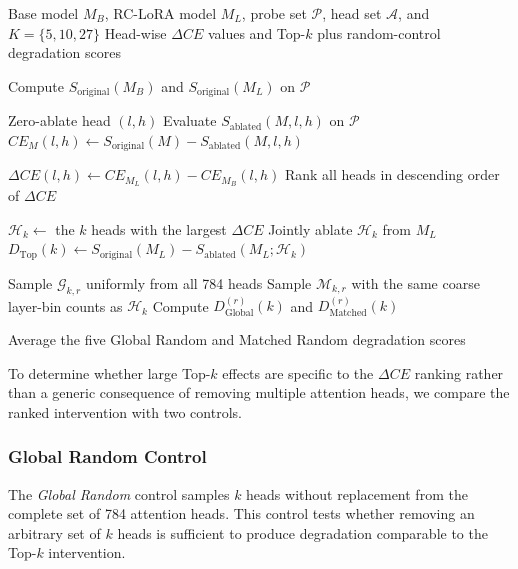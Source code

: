 \begin{algorithm}[!tbp]
\caption{Attention-Head Causal Scan and Top-$k$ Validation}
\label{alg:causal_scan_topk}
\begin{algorithmic}[1]
\Require Base model $M_B$, RC-LoRA model $M_L$, probe set $\mathcal{P}$, head set $\mathcal{A}$, and $K=\{5,10,27\}$
\Ensure Head-wise $\Delta CE$ values and Top-$k$ plus random-control degradation scores

\State Compute $S_{\mathrm{original}}(M_B)$ and $S_{\mathrm{original}}(M_L)$ on $\mathcal{P}$

        \State Zero-ablate head $(l,h)$
        \State Evaluate $S_{\mathrm{ablated}}(M,l,h)$ on $\mathcal{P}$
        \State $CE_M(l,h)\gets S_{\mathrm{original}}(M)-S_{\mathrm{ablated}}(M,l,h)$
    \EndFor
\EndFor

    \State $\Delta CE(l,h)\gets CE_{M_L}(l,h)-CE_{M_B}(l,h)$
\EndFor
\State Rank all heads in descending order of $\Delta CE$

    \State $\mathcal{H}_k\gets$ the $k$ heads with the largest $\Delta CE$
    \State Jointly ablate $\mathcal{H}_k$ from $M_L$
    \State $D_{\mathrm{Top}}(k)\gets S_{\mathrm{original}}(M_L)-S_{\mathrm{ablated}}(M_L;\mathcal{H}_k)$

        \State Sample $\mathcal{G}_{k,r}$ uniformly from all 784 heads
        \State Sample $\mathcal{M}_{k,r}$ with the same coarse layer-bin counts as $\mathcal{H}_k$
        \State Compute $D_{\mathrm{Global}}^{(r)}(k)$ and $D_{\mathrm{Matched}}^{(r)}(k)$
    \EndFor

    \State Average the five Global Random and Matched Random degradation scores
\EndFor

\end{algorithmic}
\end{algorithm}


To determine whether large Top-$k$ effects are specific to the $\Delta CE$ ranking rather than a generic consequence of removing multiple attention heads, we compare the ranked intervention with two controls.

\subsubsection{Global Random Control}

The \emph{Global Random} control samples $k$ heads without replacement from the complete set of 784 attention heads. This control tests whether removing an arbitrary set of $k$ heads is sufficient to produce degradation comparable to the Top-$k$ intervention.

